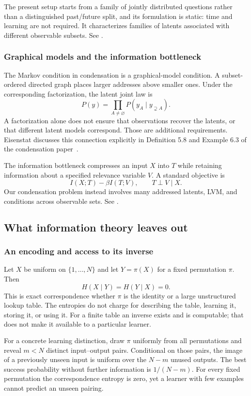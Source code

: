\documentclass[11pt]{article}
\begin{document}
The present setup starts from a family of jointly distributed questions rather
than a distinguished past/future split, and its formulation is static: time
and learning are not required. It characterizes families of latents
associated with different observable subsets.
See \citet{shalizi2001computational}.

\subsubsection{Graphical models and the information bottleneck}
The Markov condition in condensation is a graphical-model condition.
A subset-ordered directed graph places larger addresses above smaller ones.
Under the corresponding factorization, the latent joint law is
\[
 P(y)=\prod_{A\ne\varnothing}P(y_A\mid y_{\supsetneq A}).
\]
A factorization alone does not ensure that observations recover the latents,
or that different latent models correspond. Those are additional requirements.
Eisenstat discusses this connection explicitly in Definition 5.8 and Example 6.3
of the condensation paper~\citep{eisenstat2025condensation}.

The information bottleneck compresses an input $X$ into $T$ while retaining
information about a specified relevance variable $V$. A standard objective is
\[
 I(X;T)-\beta I(T;V), \qquad T\perp V\mid X.
\]
Our condensation problem instead involves many addressed latents, LVM, and
conditions across observable sets.
See \citet{tishby1999information}.

\subsection{What information theory leaves out}
\subsubsection{An encoding and access to its inverse}
Let $X$ be uniform on $\{1,\ldots,N\}$ and let $Y=\pi(X)$ for a fixed
permutation $\pi$. Then
\[
 H(X\mid Y)=H(Y\mid X)=0.
\]
This is exact correspondence whether $\pi$ is the identity or a large
unstructured lookup table. The entropies do not charge for describing the table,
learning it, storing it, or using it. For a finite table an inverse exists and is
computable; that does not make it available to a particular learner.

For a concrete learning distinction, draw $\pi$ uniformly from all permutations
and reveal $m<N$ distinct input--output pairs. Conditional on those pairs, the
image of a previously unseen input is uniform over the $N-m$ unused outputs. The best success
probability without further information is $1/(N-m)$. For every fixed permutation
the correspondence entropy is zero, yet a learner with few examples cannot
predict an unseen pairing.
\end{document}
